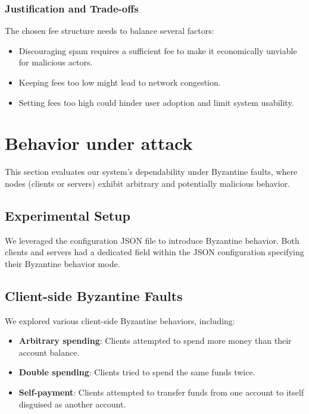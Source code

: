 \subsubsection*{Justification and Trade-offs} 
The chosen fee structure needs to balance several factors:

\begin{itemize}
    \item Discouraging spam requires a sufficient fee to make it economically unviable for malicious actors.
    \item Keeping fees too low might lead to network congestion.
    \item Setting fees too high could hinder user adoption and limit system usability.
\end{itemize}

\section{Behavior under attack}

This section evaluates our system's dependability under Byzantine faults, where nodes (clients or servers) exhibit arbitrary and potentially malicious behavior.

\subsection{Experimental Setup}

We leveraged the configuration JSON file to introduce Byzantine behavior. Both clients and servers had a dedicated field within the JSON configuration specifying their Byzantine behavior mode.

\subsection{Client-side Byzantine Faults} We explored various client-side Byzantine behaviors, including:
    \begin{itemize}
        \item \textbf{Arbitrary spending}: Clients attempted to spend more money than their account balance.
        \item \textbf{Double spending}: Clients tried to spend the same funds twice.
        \item \textbf{Self-payment}: Clients attempted to transfer funds from one account to itself disguised as another account.
    \end{itemize}

